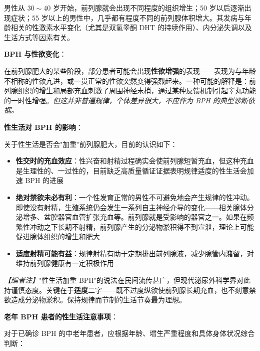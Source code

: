 男性从 $30\sim40$ 岁开始，前列腺就会出现不同程度的组织增生；50 岁以后逐渐出现症状；55 岁以上的男性中，几乎都有程度不同的前列腺体积增大。其发病与年龄相关的性激素水平变化（尤其是双氢睾酮 DHT 的持续作用）、内分泌失调以及生活方式等因素有关。

\vspace{0.5em}
\noindent\textbf{BPH 与性欲变化}：

在前列腺肥大的某些阶段，部分患者可能会出现\textbf{性欲增强}的表现——表现为与年龄不相称的性欲亢进，或一贯正常的性欲突然变得强烈起来。一种可能的解释是：前列腺组织的增生和局部充血刺激了周围神经末梢，通过某种反馈机制引起睾丸功能的一时性增强。\textit{但这并非普遍规律，个体差异很大，不应作为 BPH 的典型诊断依据。}

\vspace{0.5em}
\noindent\textbf{性生活对 BPH 的影响}：

关于性生活是否会"加重"前列腺肥大，目前的认识如下：

\begin{itemize}
	\item \textbf{性交时的充血效应}：性兴奋和射精过程确实会使前列腺短暂充血，但这种充血是生理性的、一过性的，目前缺乏高质量循证证据表明规律适度的性生活会加速 BPH 的进展
	\item \textbf{绝对禁欲未必有利}：一个性发育正常的男性不可避免地会产生规律的性冲动。即使没有射精，生殖系统仍会发生一系列自主神经介导的变化——相关腺体分泌增多、盆腔器官血管扩张充血等。前列腺就是受影响的器官之一。如果在频繁性冲动之下长期不射精，前列腺产生的分泌物淤积得不到宣泄，理论上可能促进腺体组织的增生和肥大
	\item \textbf{适度射精可能有益}：规律射精有助于定期排出前列腺液，减少腺管内潴留，对维持前列腺健康有一定积极作用
\end{itemize}

\noindent\textit{【编者注】}"性生活加重 BPH"的说法在民间流传甚广，但现代泌尿外科学界对此持谨慎态度。关键在于\textbf{适度}二字——既不过度纵欲使前列腺长期充血，也不刻意禁欲造成分泌物淤积。保持规律而节制的生活节奏最为理想。

\vspace{0.5em}
\noindent\textbf{老年 BPH 患者的性生活注意事项}：

对于已确诊 BPH 的中老年患者，应根据年龄、增生严重程度和具体身体状况综合判断：

